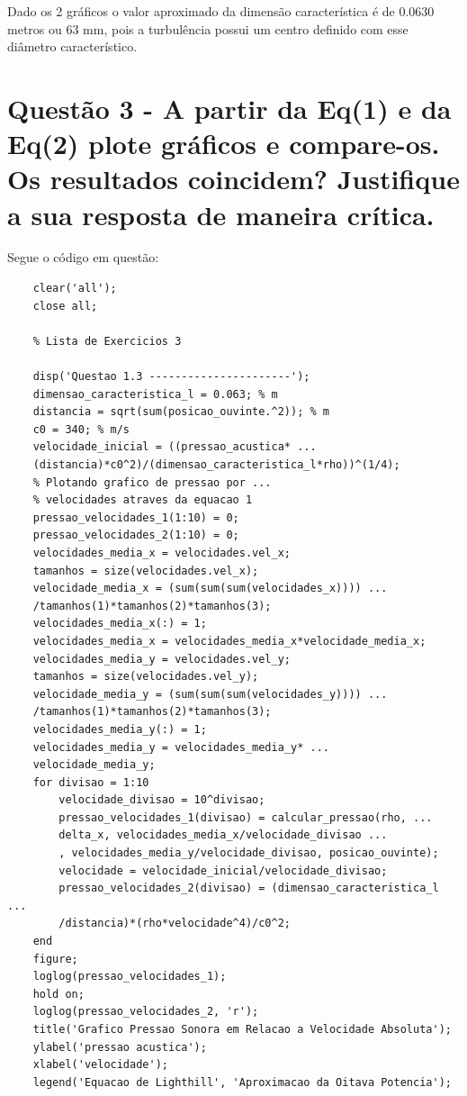 	Dado os 2 gráficos o valor aproximado da dimensão característica é de 0.0630 metros ou 63 mm, pois a turbulência possui um centro definido com esse diâmetro característico.

	\section{Questão 3 - A partir da Eq(1) e da Eq(2) plote gráficos e compare-os. Os resultados coincidem? Justifique a sua resposta de maneira crítica.}

	Segue o código em questão:
	\begin{lstlisting}
	clear('all');
	close all;

	% Lista de Exercicios 3

	disp('Questao 1.3 ----------------------');
	dimensao_caracteristica_l = 0.063; % m
	distancia = sqrt(sum(posicao_ouvinte.^2)); % m 
	c0 = 340; % m/s 
	velocidade_inicial = ((pressao_acustica* ... 
	(distancia)*c0^2)/(dimensao_caracteristica_l*rho))^(1/4);
	% Plotando grafico de pressao por ...
	% velocidades atraves da equacao 1
	pressao_velocidades_1(1:10) = 0;
	pressao_velocidades_2(1:10) = 0;
	velocidades_media_x = velocidades.vel_x;
	tamanhos = size(velocidades.vel_x);
	velocidade_media_x = (sum(sum(sum(velocidades_x)))) ... 
	/tamanhos(1)*tamanhos(2)*tamanhos(3);
	velocidades_media_x(:) = 1;
	velocidades_media_x = velocidades_media_x*velocidade_media_x;
	velocidades_media_y = velocidades.vel_y;
	tamanhos = size(velocidades.vel_y);
	velocidade_media_y = (sum(sum(sum(velocidades_y)))) ... 
	/tamanhos(1)*tamanhos(2)*tamanhos(3);
	velocidades_media_y(:) = 1;
	velocidades_media_y = velocidades_media_y* ... 
	velocidade_media_y;
	for divisao = 1:10
		velocidade_divisao = 10^divisao;
		pressao_velocidades_1(divisao) = calcular_pressao(rho, ...
		delta_x, velocidades_media_x/velocidade_divisao ...
		, velocidades_media_y/velocidade_divisao, posicao_ouvinte);
		velocidade = velocidade_inicial/velocidade_divisao;
		pressao_velocidades_2(divisao) = (dimensao_caracteristica_l ... 
		/distancia)*(rho*velocidade^4)/c0^2;
	end	
	figure;
	loglog(pressao_velocidades_1);
	hold on;
	loglog(pressao_velocidades_2, 'r');
	title('Grafico Pressao Sonora em Relacao a Velocidade Absoluta');
	ylabel('pressao acustica');
	xlabel('velocidade');
	legend('Equacao de Lighthill', 'Aproximacao da Oitava Potencia');
	\end{lstlisting}


